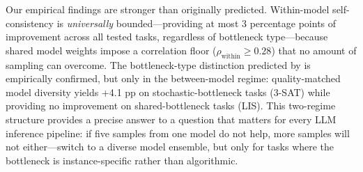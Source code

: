 \documentclass{article}
\theoremstyle{definition}
\theoremstyle{remark}
\begin{document}
Our empirical findings are stronger than originally predicted.
Within-model self-consistency is \emph{universally} bounded---providing at most 3 percentage points of improvement across all tested tasks, regardless of bottleneck type---because shared model weights impose a correlation floor ($\rho_{\text{within}} \geq 0.28$) that no amount of sampling can overcome.
The bottleneck-type distinction predicted by  is empirically confirmed, but only in the between-model regime: quality-matched model diversity yields +4.1 pp on stochastic-bottleneck tasks (3-SAT) while providing no improvement on shared-bottleneck tasks (LIS).
This two-regime structure provides a precise answer to a question that matters for every LLM inference pipeline: if five samples from one model do not help, more samples will not either---switch to a diverse model ensemble, but only for tasks where the bottleneck is instance-specific rather than algorithmic.

\begin{ack}
\end{ack}


\end{document}
